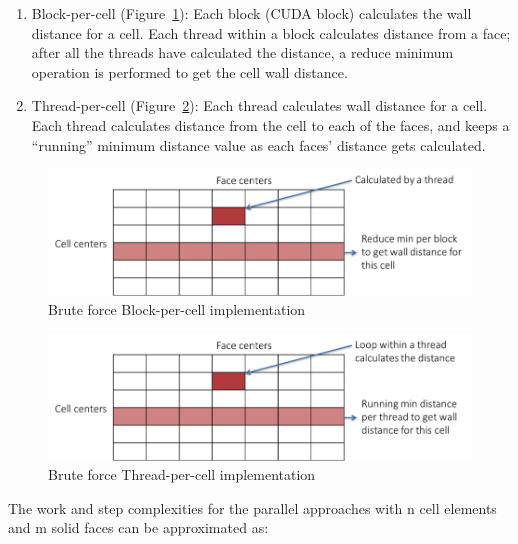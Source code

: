 \documentclass[]{aiaa-tc}%
\begin{document}
\begin{enumerate}
  
  \item Block-per-cell (Figure~\ref{f:bf_3}): Each block (CUDA
    block) calculates the wall distance for a cell.  Each thread
    within a block calculates distance from a face; after all the
    threads have calculated the distance, a reduce minimum operation
    is performed to get the cell wall distance. 

  \item Thread-per-cell (Figure~\ref{f:bf_4}): Each thread calculates wall
    distance for a cell.  Each thread calculates distance from the
    cell to each of the faces, and keeps a “running” minimum distance
    value as each faces’ distance gets calculated. 

\end{enumerate}


\begin{figure}
  \includegraphics[]{figures/brute_force/bf_3}
  \caption{Brute force Block-per-cell implementation}
  \label{f:bf_3}
\end{figure}

\begin{figure}
  \includegraphics[]{figures/brute_force/bf_4}
  \caption{Brute force Thread-per-cell implementation}
  \label{f:bf_4}
\end{figure}


The work and step complexities for the parallel approaches with n cell
elements and m solid faces can be approximated as:
\end{document}
